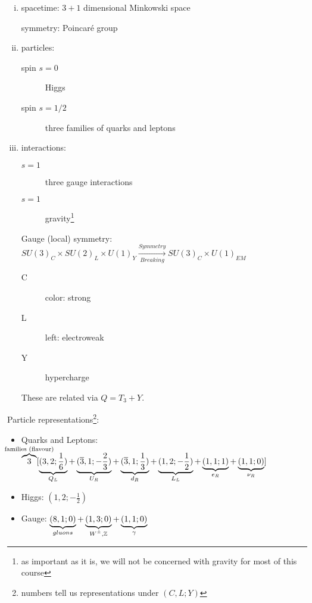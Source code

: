\begin{enumerate}[(i)]
  \item spacetime: $3 + 1$ dimensional Minkowski space\par
    symmetry: Poincar\'e group
  \item particles: 
    \begin{description}
      \item[spin $s = 0$] Higgs
      \item[spin $s = 1 / 2$] three families of quarks and leptons
    \end{description}
  \item interactions:
    \begin{description}
      \item[$s = 1$] three gauge interactions
      \item[$s = 1$] gravity\footnote{as important as it is, we will not be concerned with gravity for most of this course}
    \end{description}
    Gauge (local) symmetry: $SU(3)_C \times SU(2)_L \times U(1)_Y \xrightarrow[Breaking]{Symmetry} SU(3)_C \times U(1)_{EM}$
    \begin{description}
      \item[C] color: strong
      \item[L] left: electroweak
      \item[Y] hypercharge
    \end{description}
    These are related via $Q = T_3 + Y$.\par
\end{enumerate}

Particle representations\footnote{numbers tell us representations under $(C, L; Y)$}:
\begin{itemize}
  \item Quarks and Leptons: $\overbrace{3}^{\mathclap{\text{families (flavour)}}}[\underbrace{(3, 2; \frac{1}{6})}_{\mathclap{Q_L}} + \underbrace{(\overline{3}, 1; -\frac{2}{3})}_{\mathclap{U_R}} + \underbrace{(\overline{3}, 1; \frac{1}{3})}_{\mathclap{d_R}} + \underbrace{(1, 2; -\frac{1}{2})}_{\mathclap{L_L}} 
    + \underbrace{(1, 1; 1)}_{\mathclap{e_R}} + \underbrace{(1, 1; 0)}_{\mathclap{\nu_R}}]$ 
  \item Higgs: $(1, 2; -\frac{1}{2})$ 
  \item Gauge: $\underbrace{(8, 1; 0)}_{\mathclap{gluons}} + \underbrace{(1, 3; 0)}_{\mathclap{W^{\pm}, \mathbb{Z}}} + \underbrace{(1, 1; 0)}_{\mathclap{\gamma}}$ 
\end{itemize}

